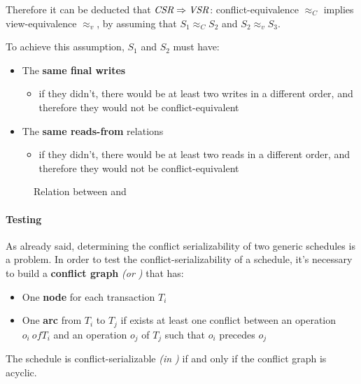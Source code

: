 \documentclass[english]{article}
\begin{document}
\bigskip
Therefore it can be deducted that \(\textit{CSR} \Rightarrow \textit{VSR}\): conflict-equivalence \(\approx_C\) implies view-equivalence \(\approx_v\), by assuming that \(S_1 \approx_C S_2\) and \(S_2 \approx_v S_3\).

To achieve this assumption, \(S_1\) and \(S_2\) must have:

\begin{itemize}
  \item The \textbf{same final writes}
        \begin{itemize}
          \item if they didn't, there would be at least two writes in a different order, and therefore they would not be conflict-equivalent
        \end{itemize}
  \item The \textbf{same reads-from} relations
        \begin{itemize}
          \item if they didn't, there would be at least two reads in a different order, and therefore they would not be conflict-equivalent
        \end{itemize}
\end{itemize}

\begin{figure}[htbp]
  \bigskip
  \centering
  \caption{Relation between \VSR and \CSR}
  \label{fig:relation-between-vsr-and-csr}
  \bigskip
\end{figure}

\paragraph{Testing \CSR}

As already said, determining the conflict serializability of two generic schedules is a \NPC problem.
In order to test the conflict-serializability of a schedule, it's necessary to build a \textbf{conflict graph} \textit{(or \CG)} that has:

\begin{itemize}
  \item One \textbf{node} for each transaction \(T_i\)
  \item One \textbf{arc} from \(T_i\) to \(T_j\) if exists at least one conflict between an operation \(o_i\ of T_i\) and an operation \(o_j\) of \(T_j\) such that \(o_i\) precedes \(o_j\)
\end{itemize}

The schedule is conflict-serializable \textit{(in \CSR)} if and only if the conflict graph is acyclic.
\end{document}
